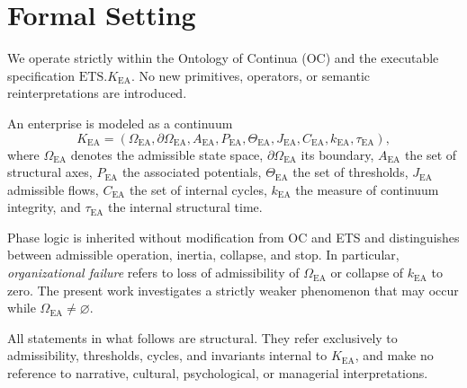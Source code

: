 ﻿\section{Formal Setting}

We operate strictly within the Ontology of Continua (OC) and the executable
specification $\mathrm{ETS}.K_{\mathrm{EA}}$. No new primitives, operators, or
semantic reinterpretations are introduced.

An enterprise is modeled as a continuum
\[
K_{\mathrm{EA}} =
(\Omega_{\mathrm{EA}}, \partial\Omega_{\mathrm{EA}},
A_{\mathrm{EA}}, P_{\mathrm{EA}}, \Theta_{\mathrm{EA}},
J_{\mathrm{EA}}, C_{\mathrm{EA}}, k_{\mathrm{EA}}, \tau_{\mathrm{EA}}),
\]
where $\Omega_{\mathrm{EA}}$ denotes the admissible state space,
$\partial\Omega_{\mathrm{EA}}$ its boundary,
$A_{\mathrm{EA}}$ the set of structural axes,
$P_{\mathrm{EA}}$ the associated potentials,
$\Theta_{\mathrm{EA}}$ the set of thresholds,
$J_{\mathrm{EA}}$ admissible flows,
$C_{\mathrm{EA}}$ the set of internal cycles,
$k_{\mathrm{EA}}$ the measure of continuum integrity, and
$\tau_{\mathrm{EA}}$ the internal structural time.

Phase logic is inherited without modification from OC and ETS and distinguishes
between admissible operation, inertia, collapse, and stop. In particular,
\emph{organizational failure} refers to loss of admissibility of
$\Omega_{\mathrm{EA}}$ or collapse of $k_{\mathrm{EA}}$ to zero. The present work
investigates a strictly weaker phenomenon that may occur while
$\Omega_{\mathrm{EA}} \neq \varnothing$.

All statements in what follows are structural. They refer exclusively to
admissibility, thresholds, cycles, and invariants internal to
$K_{\mathrm{EA}}$, and make no reference to narrative, cultural, psychological,
or managerial interpretations.
